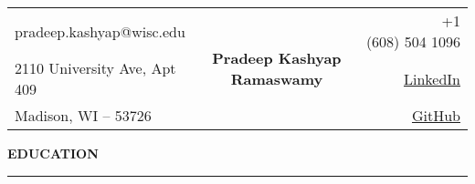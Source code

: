 \documentclass[a4paper, 10pt]{extarticle}
\author{Pradeep Kashyap Ramaswamy}
\date{December 2016}
\begin{document}
{\begin{center}
\begin{tabular}{l c r}
    pradeep.kashyap@wisc.edu  & \multirow{3}{*}{\LARGE{\textbf{ Pradeep Kashyap
Ramaswamy}}} & \ \ \ \ \ \ +1 (608) 504 1096 \\
     2110 University Ave, Apt 409 & &
\href{https://www.linkedin.com/in/pradeep-kashyap-ramaswamy}{LinkedIn} \\
     Madison, WI -- 53726 & & \href{https://github.com/pradeep0605}{GitHub}\\
\end{tabular}
\end{center}}


\begin{flushleft}
{\LARGE{\textbf{E}}\Large{\textbf{DUCATION}}}
\end{flushleft}
\vspace{-0.2cm}\hrule \vspace{.1cm}
\end{document}
